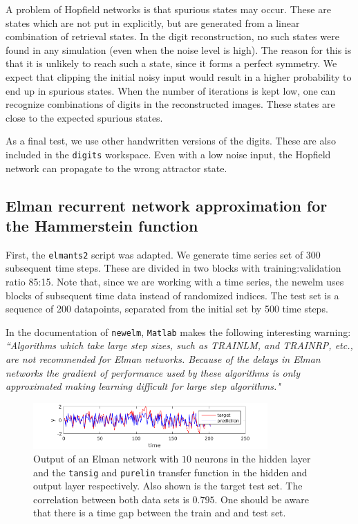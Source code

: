 \documentclass[pdftex,11pt,a4paper]{article}
\begin{document}
A problem of Hopfield networks is that spurious states may occur. These are states which are not put in explicitly, but are generated from a linear combination of retrieval states. In the digit reconstruction, no such states were found in any simulation (even when the noise level is high). The reason for this is that it is unlikely to reach such a state, since it forms a perfect symmetry. We expect that clipping the initial noisy input would result in a higher probability to end up in spurious states. When the number of iterations is kept low, one can recognize combinations of digits in the reconstructed images. These states are close to the expected spurious states. 

As a final test, we use other handwritten versions of the digits. These are also included in the \texttt{digits} workspace. Even with a low noise input, the Hopfield network can propagate to the wrong attractor state.

\subsection{Elman recurrent network approximation for the Hammerstein function}
First, the \texttt{elmants2} script was adapted. We generate time series set of 300 subsequent time steps. These are divided in two blocks with training:validation ratio 85:15. Note that, since we are working with a time series, the newelm uses blocks of subsequent time data instead of randomized indices. The test set is a sequence of 200 datapoints, separated from the initial set by 500 time steps.

In the documentation of \texttt{newelm}, \texttt{Matlab} makes the following interesting warning:
\textit{``Algorithms which take large step sizes, such as TRAINLM,
     and TRAINRP, etc., are not recommended for Elman networks.  Because
     of the delays in Elman networks the gradient of performance used
     by these algorithms is only approximated making learning difficult
     for large step algorithms."}

\begin{figure}[tbh]
\centering
\includegraphics[width=0.8\textwidth]{figs/tansig_purelin.png}
\caption{Output of an Elman network with $10$ neurons in the hidden layer and the \texttt{tansig} and \texttt{purelin} transfer function in the hidden and output layer respectively. Also shown is the target test set. The correlation between both data sets is $0.795$. One should be aware that there is a time gap between the train and and test set. \label{fig:tansig_purelin}}
\end{figure}
\end{document}
